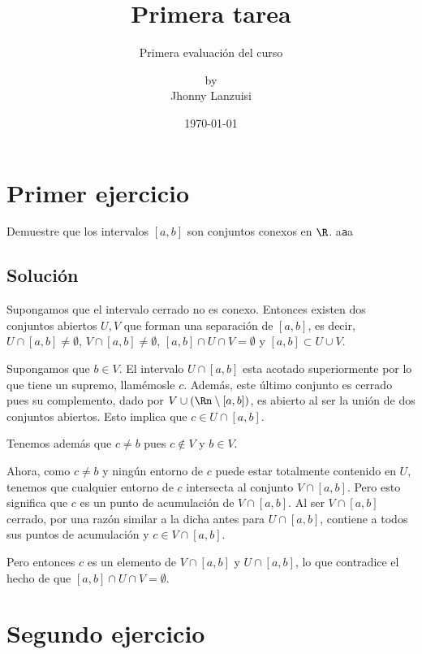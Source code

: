 \documentclass{scrartcl}
\begin{document}
%
\title{Primera tarea}
\subtitle{Primera evaluación del curso}
\subject{Análisis III}
\titlehead{Universidad Simón Bolívar\hfill Caracas, Venezuela}
\author{by \\ Jhonny Lanzuisi}
\date{\today}
\maketitle

\section{Primer ejercicio}

Demuestre que los intervalos \([a,b]\) son conjuntos conexos
en \(\R\). a\texttt{a}a

\subsection{Solución}

Supongamos que el intervalo cerrado no es conexo.
Entonces existen dos conjuntos abiertos \(U,V\) que forman
una separación de \([a,b]\), es decir,
\(U\cap[a,b]\neq\emptyset\), \(V\cap[a,b]\neq\emptyset\),
\([a,b]\cap U\cap V = \emptyset\) y \([a,b]\subset U\cup V\).

Supongamos que \(b\in V\).
El intervalo \(U\cap[a,b]\) esta acotado superiormente
por lo que tiene un supremo, llamémosle \(c\).
Además, este último conjunto es cerrado pues
su complemento, dado por \(V\cup(\Rn\setminus[a,b])\),
es abierto al ser la unión de dos conjuntos abiertos.
Esto implica que \(c \in U\cap[a,b]\).

Tenemos además que \(c\neq b\) pues \(c\not\in V\) y
\(b\in V\).

Ahora, como \(c\neq b\) y ningún entorno de \(c\)
puede estar totalmente contenido en \(U\), tenemos
que cualquier entorno de \(c\) intersecta al conjunto \(V\cap[a,b]\).
Pero esto significa que \(c\) es un punto de acumulación
de \(V\cap[a,b]\). Al ser \(V\cap[a,b]\) cerrado, por una razón
similar a la dicha antes para \(U\cap[a,b]\), contiene a todos
sus puntos de acumulación y \(c \in V\cap[a,b]\).

Pero entonces \(c\) es un elemento de \(V\cap[a,b]\) y \(U\cap[a,b]\),
lo que contradice el hecho de que \([a,b]\cap U\cap V = \emptyset\).
\section{Segundo ejercicio}
\end{document}
